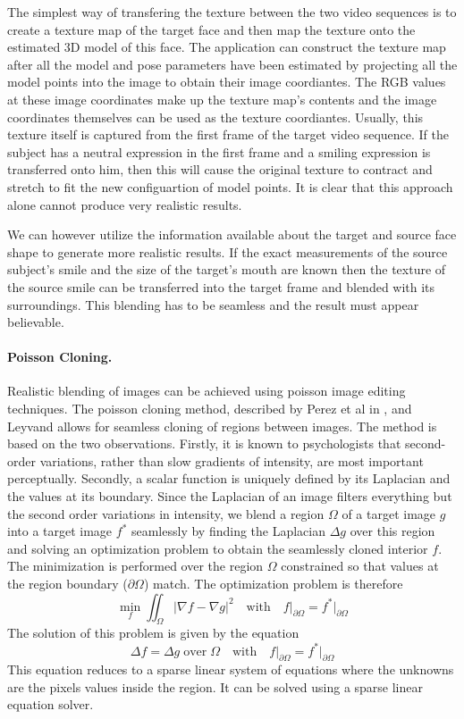 \documentclass[11pt,a4paper]{report}
\begin{document}
The simplest way of transfering the texture between the two
video sequences is to create a texture map of the target face and then map
the texture onto the estimated 3D model of this face. The application can
construct the texture map after all the model and pose parameters have been
estimated by projecting all the model points into the image to obtain their
image coordiantes. The RGB values at these image coordinates make up the texture
map's contents and the image coordinates themselves can be used as the texture
coordiantes. Usually, this texture itself is captured from the first frame of the
target video sequence. If the subject has a neutral expression in the first frame and a smiling expression is
transferred onto him, then this will cause the original texture to contract and
stretch to fit the new configuartion of model points. It is clear that this
approach alone cannot produce very realistic results. 

We can however utilize the information available about the target and source
face shape to generate more realistic results. If the exact measurements of the
source subject's smile and the size of the target's mouth are known then the texture
of the source smile can be transferred into the target frame and blended with its
surroundings. This blending has to be seamless and the result must appear believable. 

\paragraph{Poisson Cloning.} Realistic blending of images can be achieved using
poisson image editing techniques. The poisson cloning method, described by Perez
et al in \cite{perez}, and Leyvand \cite{poisson} allows for seamless cloning of
regions between images.
The method is based on the two observations. Firstly, it is known to
psychologists \cite{perez} that second-order variations, rather than
slow gradients of intensity, are most important perceptually. Secondly, a scalar
function is uniquely defined by its Laplacian and the values at its
boundary. Since the Laplacian of an image filters everything but the second
order variations in intensity, we blend a region $\Omega$ of a target image $g$ into a
target image $f^*$ seamlessly
by finding the Laplacian $\Delta g$ over this region and solving an optimization
problem to obtain the seamlessly cloned interior $f$. The minimization is
performed over the region $\Omega$ constrained so that values at the region boundary
($\partial \Omega$) match. The optimization problem is therefore 
\begin{equation}
\mathop{min}_f \iint_{\Omega} \vert \nabla f  - \nabla g \vert^2 \quad \mathrm{with} \quad
f\vert_{\partial \Omega} = f^*\vert_{\partial \Omega}
\end{equation}
The solution of this problem is given by the equation
\begin{equation}
\Delta f = \Delta g \; \mathrm{over} \; \Omega \quad \mathrm{with} \quad
f\vert_{\partial \Omega} = f^*\vert_{\partial \Omega}
\end{equation}
This equation reduces to a sparse linear system of equations where the unknowns are the
pixels values inside the region. It can be solved using a sparse linear equation
solver.
\end{document}
